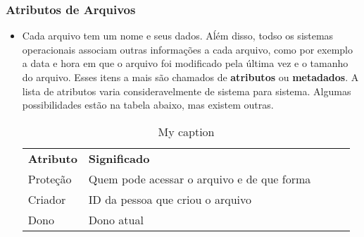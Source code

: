 \documentclass[10pt]{article}
\begin{document}
\subsubsection{Atributos de Arquivos}
\begin{itemize}
    \item Cada arquivo tem um nome e seus dados. Aĺém disso, todso os sistemas operacionais associam outras informações a cada
    arquivo, como por exemplo a data e hora em que o arquivo foi modificado pela última vez e o tamanho do arquivo. Esses
    itens a mais são chamados de \textbf{atributos} ou \textbf{metadados}. A lista de atributos varia consideravelmente
    de sistema para sistema. Algumas possibilidades estão na tabela abaixo, mas existem outras.
    \begin{table}[]
        \centering
        \caption{My caption}
        \label{my-label}
        \begin{tabular}{lllll}
        \textbf{Atributo} & \textbf{Significado}                       &  &  &  \\
        Proteção          & Quem pode acessar o arquivo e de que forma &  &  &  \\
        Criador           & ID da pessoa que criou o arquivo           &  &  &  \\
        Dono              & Dono atual                                 &  &  & 
        \end{tabular}
    \end{table}

\end{itemize}
\end{document}
